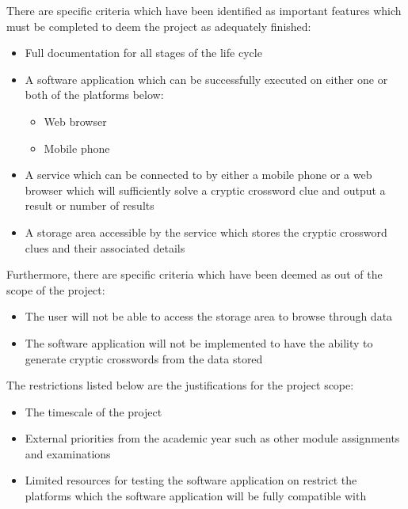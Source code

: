 There are specific criteria which have been identified as important features which must be completed to deem
the project as adequately finished:
\begin{itemize}
	\item Full documentation for all stages of the life cycle
	\item A software application which can be successfully executed on either one or both of the platforms below:
		\begin{itemize}
			\item Web browser
			\item Mobile phone
		\end{itemize}
	\item A service which can be connected to by either a mobile phone or a web browser which will
sufficiently solve a cryptic crossword clue and output a result or number of results 
	\item A storage area accessible by the service which stores the cryptic crossword clues
and their associated details
\end{itemize}

Furthermore, there are specific criteria which have been deemed as out of the scope of the project:
\begin{itemize}
	\item The user will not be able to access the storage area to browse through data
	\item The software application will not be implemented to have the ability to generate
cryptic crosswords from the data stored
\end{itemize}

The restrictions listed below are the justifications for the project scope:
\begin{itemize}
	\item The timescale of the project
	\item External priorities from the academic year such as other module assignments
and examinations
	\item Limited resources for testing the software application on restrict the platforms
which the software application will be fully compatible with
\end{itemize}

